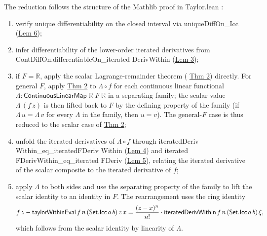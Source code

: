 \documentclass[11pt,reqno]{amsart}
\begin{document}
\noindent The reduction follows the structure of the Mathlib proof in 
\textsf{Taylor.lean} \cite{mathlib4-taylor}:

\begin{enumerate}
\item verify unique differentiability on the closed interval via \textsf{%
unique\allowbreak Diff\allowbreak On\allowbreak\_Icc} (\hyperlink{lem:uniqueIcc}%
{Lem 6});

\item infer differentiability of the lower-order iterated derivatives from 
\textsf{ContDiffOn.differentiableOn\allowbreak\_iterated\allowbreak
Deriv\allowbreak Within} (\hyperlink{lem:diffiter}{Lem 3});

\item if $F=\mathbb{R}$, apply the scalar Lagrange-remainder theorem (
\hyperlink{thm:scalar}{Thm 2}) directly. For general $F$, apply \hyperlink{thm:scalar}%
{Thm 2} to $\Lambda\circ f$ for each continuous linear functional $\Lambda:%
\mathsf{ContinuousLinearMap}\;\mathbb{R}\;F\;\mathbb{R}$ in a separating
family; the scalar value $\Lambda\,(f\,z)$ is then lifted back to $F$ by the
defining property of the family (if $\Lambda\,u=\Lambda\,v$ for every $%
\Lambda$ in the family, then $u=v$). The general-$F$ case is thus reduced to
the scalar case of \hyperlink{thm:scalar}{Thm 2};

\item unfold the iterated derivatives of $\Lambda\circ f$ through \textsf{%
iterated\allowbreak Deriv\allowbreak
Within\allowbreak\_eq\allowbreak\_iterated\allowbreak FDeriv\allowbreak
Within} (\hyperlink{lem:iterFD}{Lem 4}) and \textsf{iterated\allowbreak
FDeriv\allowbreak Within\allowbreak\_eq\allowbreak\_iterated\allowbreak
FDeriv} (\hyperlink{lem:iterFDUniv}{Lem 5}), relating the iterated
derivative of the scalar composite to the iterated derivative of $f$;

\item apply $\Lambda$ to both sides and use the separating property of the
family to lift the scalar identity to an identity in $F$. The rearrangement
uses the ring identity 
\begin{equation}  \label{eq:combined}
f\,z-\mathsf{taylorWithinEval}\,f\,n\,(\mathsf{Set.Icc}\,a\,b)\,z\,x = \frac{%
(z-x)^{n}}{n!}\cdot\mathsf{iteratedDerivWithin}\,f\,n\,(\mathsf{Set.Icc}%
\,a\,b)\,\xi ,
\end{equation}
which follows from the scalar identity by linearity of $\Lambda$.
\end{enumerate}
\end{document}
